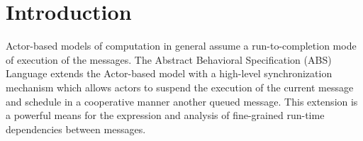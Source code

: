 \section{Introduction}




Actor-based models of computation in general assume a run-to-completion mode
of execution of the messages.
The Abstract Behavioral Specification (ABS) Language extends the Actor-based model
with  a high-level synchronization mechanism which allows actors to suspend the
execution of the current message and schedule in a cooperative manner another
queued message.  This  extension  is a powerful means for the expression and analysis
of fine-grained run-time dependencies between messages.




